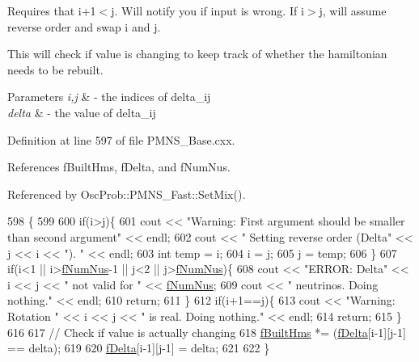 Requires that i+1$<$j. Will notify you if input is wrong. If i$>$j, will assume reverse order and swap i and j.

This will check if value is changing to keep track of whether the hamiltonian needs to be rebuilt.


\begin{DoxyParams}{Parameters}
{\em i,j} & -\/ the indices of delta\+\_\+ij \\
\hline
{\em delta} & -\/ the value of delta\+\_\+ij \\
\hline
\end{DoxyParams}


Definition at line 597 of file P\+M\+N\+S\+\_\+\+Base.\+cxx.



References f\+Built\+Hms, f\+Delta, and f\+Num\+Nus.



Referenced by Osc\+Prob\+::\+P\+M\+N\+S\+\_\+\+Fast\+::\+Set\+Mix().


\begin{DoxyCode}
598 \{
599 
600   \textcolor{keywordflow}{if}(i>j)\{
601     cout << \textcolor{stringliteral}{"Warning: First argument should be smaller than second argument"} << endl;
602     cout << \textcolor{stringliteral}{"         Setting reverse order (Delta"} << j << i << \textcolor{stringliteral}{"). "} << endl;
603     \textcolor{keywordtype}{int} temp = i;
604     i = j;
605     j = temp;
606   \}
607   \textcolor{keywordflow}{if}(i<1 || i>\hyperlink{classOscProb_1_1PMNS__Base_a24bb74bed63569dfe88b18fa6a08060e}{fNumNus}-1 || j<2 || j>\hyperlink{classOscProb_1_1PMNS__Base_a24bb74bed63569dfe88b18fa6a08060e}{fNumNus})\{
608     cout << \textcolor{stringliteral}{"ERROR: Delta"} << i << j << \textcolor{stringliteral}{" not valid for "} << \hyperlink{classOscProb_1_1PMNS__Base_a24bb74bed63569dfe88b18fa6a08060e}{fNumNus};
609     cout << \textcolor{stringliteral}{" neutrinos. Doing nothing."} << endl;
610     \textcolor{keywordflow}{return};
611   \}
612   \textcolor{keywordflow}{if}(i+1==j)\{
613     cout << \textcolor{stringliteral}{"Warning: Rotation "} << i << j << \textcolor{stringliteral}{" is real. Doing nothing."} << endl;
614     \textcolor{keywordflow}{return};
615   \}
616 
617   \textcolor{comment}{// Check if value is actually changing}
618   \hyperlink{classOscProb_1_1PMNS__Base_a9ac3cadeac8db1b90f3152f476244780}{fBuiltHms} *= (\hyperlink{classOscProb_1_1PMNS__Base_ab2a5fa40e689b221c8a7d2c17213810d}{fDelta}[i-1][j-1] == delta);
619 
620   \hyperlink{classOscProb_1_1PMNS__Base_ab2a5fa40e689b221c8a7d2c17213810d}{fDelta}[i-1][j-1] = delta;
621 
622 \}
\end{DoxyCode}
